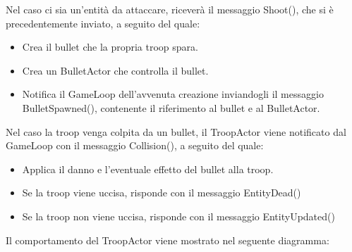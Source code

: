Nel caso ci sia un'entità da attaccare, riceverà il messaggio Shoot(), che si è precedentemente inviato, a seguito del quale:

\begin{itemize}
    \item Crea il bullet che la propria troop spara.
    \item Crea un BulletActor che controlla il bullet.
    \item Notifica il GameLoop dell'avvenuta creazione inviandogli il messaggio BulletSpawned(), contenente il riferimento al bullet e al BulletActor.
\end{itemize}

Nel caso la troop venga colpita da un bullet, il TroopActor viene notificato dal GameLoop con il messaggio Collision(), a seguito del quale:

\begin{itemize}
    \item Applica il danno e l'eventuale effetto del bullet alla troop.
    \item Se la troop viene uccisa, risponde con il messaggio EntityDead()
    \item Se la troop non viene uccisa, risponde con il messaggio EntityUpdated()
\end{itemize}

Il comportamento del TroopActor viene mostrato nel seguente diagramma:

